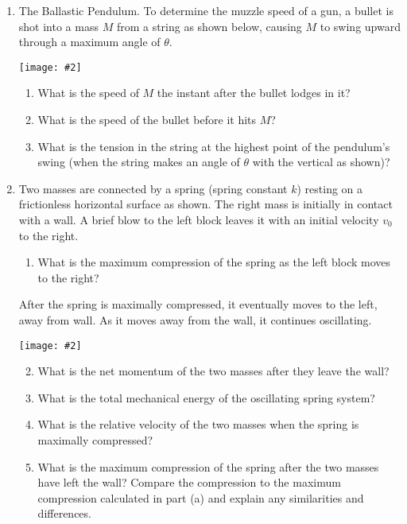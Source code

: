 \documentclass[12pt]{article}
\newcommand{\pic}[2]{\texttt{[image: \#2]}}
\begin{document}
\begin{enumerate}[leftmargin=15pt]
\item The Ballastic Pendulum. To determine the muzzle speed of a gun, a bullet
  is shot into a mass $M$ from a string as shown below, causing $M$ to swing
  upward through a maximum angle of $\theta$.
  \begin{center}
    \pic{.4}{ballastic.png}
  \end{center}
  \begin{enumerate}[noitemsep]
  \item What is the speed of $M$ the instant after the bullet lodges in it?
  \item What is the speed of the bullet before it hits $M$?
  \item What is the tension in the string at the highest point of the pendulum's
    swing (when the string makes an angle of $\theta$ with the vertical as
    shown)?
  \end{enumerate}
  \newpage
\item Two masses are connected by a spring (spring constant $k$) resting on a
  frictionless horizontal surface as shown. The right mass is initially in
  contact with a wall. A brief blow to the left block leaves it with an initial
  velocity $v_0$ to the right.
  \begin{enumerate}
  \item What is the maximum compression of the spring as the left block moves
    to the right?
  \end{enumerate}
  After the spring is maximally compressed, it eventually moves to the left,
  away from wall. As it moves away from the wall, it continues oscillating.
  \begin{center}
    \pic{.5}{mass-spring-2.png}
  \end{center}
  \begin{enumerate}
    \setcounter{enumii}{1}
  \item What is the net momentum of the two masses after they leave the wall?
  \item What is the total mechanical energy of the oscillating spring system?
  \item What is the relative velocity of the two masses when the spring is
    maximally compressed?
  \item What is the maximum compression of the spring after the two masses have
    left the wall? Compare the compression to the maximum compression calculated
    in part (a) and explain any similarities and differences.
  \end{enumerate}




\end{enumerate}
\end{document}
